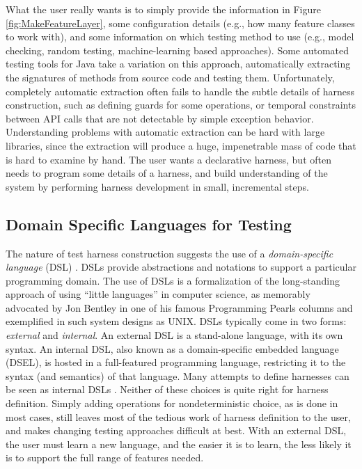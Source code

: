 What the user really wants is to simply provide the information in
Figure \ref{fig:MakeFeatureLayer}, some configuration details (e.g., how many
feature classes to work with), and some information on which testing
method to use (e.g., model checking, random testing, machine-learning
based approaches).  Some automated testing tools for Java \cite{FA11,Pacheco}
take a variation on this approach, automatically extracting the
signatures of methods from source code and testing them.
Unfortunately, completely automatic extraction often fails to handle
the subtle details of harness construction, such as defining guards
for some operations, or temporal constraints between API calls that
are not detectable by simple exception behavior.  Understanding
problems with automatic extraction can be hard with large libraries,
since the extraction will produce a huge, impenetrable mass of code
that is hard to examine by hand.  The user wants a
declarative harness, but often needs to program some details of a
harness, and build understanding of the system by performing harness development in
small, incremental steps.

\subsection{Domain Specific Languages for Testing}

The nature of test harness construction suggests the use of a
\emph{domain-specific language} (DSL) \cite{ISOLA12}.  DSLs
\cite{Fow10} provide abstractions and notations to support a
particular programming domain. The use of DSLs is a formalization of
the long-standing approach of using ``little languages'' in computer
science, as memorably advocated by Jon Bentley in one of his famous
Programming Pearls columns \cite{LitLang} and exemplified in such system
designs as UNIX.  DSLs typically come in two forms: \emph{external}
and \emph{internal}.  An external DSL is a stand-alone language, with
its own syntax.  An internal DSL, also known as a domain-specific
embedded language (DSEL), is hosted in a full-featured programming
language, restricting it to the syntax (and semantics) of that
language.  Many attempts to define harnesses can be seen as internal
DSLs \cite{UDITA,ISSRE12,JPF2,CBMCp,KLEE}.  Neither of these choices
is quite right for harness definition.  Simply adding operations for
nondeterministic choice, as is done in most cases, still leaves most of
the tedious work of harness definition to the user, and makes changing
testing approaches difficult at best.  With an external DSL, the user
must learn a new language, and the easier it is to learn, the less
likely it is to support the full range of features needed.

